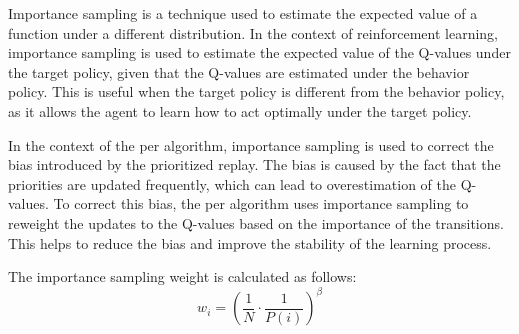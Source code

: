 Importance sampling is a technique used to estimate the expected value of
a function under a different distribution. In the context of reinforcement
learning, importance sampling is used to estimate the expected value of the
Q-values under the target policy, given that the Q-values are estimated under
the behavior policy. This is useful when the target policy is different from
the behavior policy, as it allows the agent to learn how to act optimally under
the target policy.

In the context of the \gls{per} algorithm, importance sampling is used to
correct the bias introduced by the prioritized replay. The bias is caused by
the fact that the priorities are updated frequently, which can lead to
overestimation of the Q-values. To correct this bias, the \gls{per} algorithm
uses importance sampling to reweight the updates to the Q-values based on the
importance of the transitions. This helps to reduce the bias and improve the
stability of the learning process.

The importance sampling weight is calculated as follows:
\begin{equation}
    w_i = \left( \frac{1}{N} \cdot \frac{1}{P(i)} \right)^{\beta}
\end{equation}